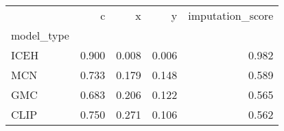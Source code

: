 \begin{tabular}{lrrrr}
\toprule
 & c & x & y & imputation_score \\
model_type &  &  &  &  \\
\midrule
ICEH & 0.900 & 0.008 & 0.006 & 0.982 \\
MCN & 0.733 & 0.179 & 0.148 & 0.589 \\
GMC & 0.683 & 0.206 & 0.122 & 0.565 \\
CLIP & 0.750 & 0.271 & 0.106 & 0.562 \\
\bottomrule
\end{tabular}
